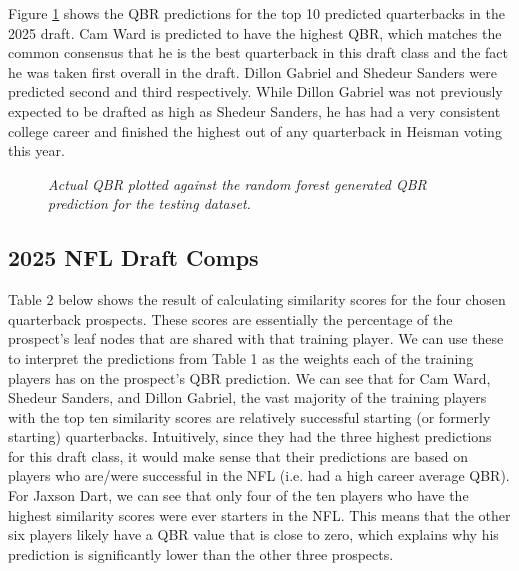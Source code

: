\documentclass{article}
\begin{document}
Figure \ref{fig:predicted-vs-actuals} shows the QBR predictions for the top 10 predicted quarterbacks in the 2025 draft. Cam Ward is predicted to have the highest QBR, which matches the common consensus that he is the best quarterback in this draft class and the fact he was taken first overall in the draft. Dillon Gabriel and Shedeur Sanders were predicted second and third respectively. While Dillon Gabriel was not previously expected to be drafted as high as Shedeur Sanders, he has had a very consistent college career and finished the highest out of any quarterback in Heisman voting this year.

\begin{figure}[H]
    \centering
    \caption{\textit{Actual QBR plotted against the random forest generated QBR prediction for the testing dataset.}}
    \label{fig:predicted-vs-actuals}
\end{figure}



\subsection{2025 NFL Draft Comps}

Table 2 below shows the result of calculating similarity scores for the four chosen quarterback prospects. These scores are essentially the percentage of the prospect's leaf nodes that are shared with that training player. We can use these to interpret the predictions from Table 1 as the weights each of the training players has on the prospect's QBR prediction. We can see that for Cam Ward, Shedeur Sanders, and Dillon Gabriel, the vast majority of the training players with the top ten similarity scores are relatively successful starting (or formerly starting) quarterbacks. Intuitively, since they had the three highest predictions for this draft class, it would make sense that their predictions are based on players who are/were successful in the NFL (i.e. had a high career average QBR). For Jaxson Dart, we can see that only four of the ten players who have the highest similarity scores were ever starters in the NFL. This means that the other six players likely have a QBR value that is close to zero, which explains why his prediction is significantly lower than the other three prospects.
\end{document}
